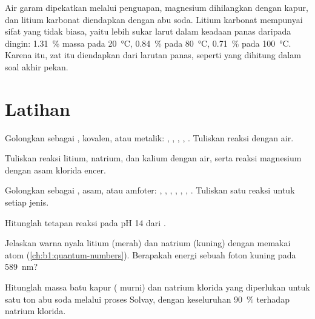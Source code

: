 Air garam dipekatkan melalui penguapan, magnesium dihilangkan dengan
kapur, dan litium karbonat diendapkan dengan abu soda. Litium karbonat
mempunyai sifat yang tidak biasa, yaitu lebih sukar larut dalam keadaan
panas daripada dingin: \qty{1.31}{\percent} massa pada
\qty{20}{\celsius}, \qty{0.84}{\percent} pada \qty{80}{\celsius},
\qty{0.71}{\percent} pada \qty{100}{\celsius}. Karena itu, zat itu
diendapkan dari larutan panas, seperti yang dihitung dalam soal akhir
pekan.

\section{Latihan}

\begin{exercise}[$\star$]\label{exo:b1:s-block:1}
Golongkan sebagai , kovalen, atau metalik: , ,
, , . Tuliskan reaksi  dengan air.
\end{exercise}

\begin{exercise}[$\star$]\label{exo:b1:s-block:2}
Tuliskan reaksi litium, natrium, dan kalium dengan air, serta reaksi
magnesium dengan asam klorida encer.
\end{exercise}

\begin{exercise}[$\star$]\label{exo:b1:s-block:3}
Golongkan sebagai , asam, atau amfoter: , , ,
, , , . Tuliskan satu reaksi untuk setiap jenis.
\end{exercise}

\begin{exercise}[$\star$]\label{exo:b1:s-block:4}
Hitunglah tetapan reaksi  pada pH 14
dari .
\end{exercise}

\begin{exercise}[$\star\star$]\label{exo:b1:s-block:5}
Jelaskan warna nyala litium (merah) dan natrium (kuning) dengan memakai
 atom (\cref{ch:b1:quantum-numbers}). Berapakah energi
sebuah foton kuning pada \qty{589}{nm}?
\end{exercise}

\begin{exercise}[$\star\star$]\label{exo:b1:s-block:6}
Hitunglah massa batu kapur ( murni) dan natrium klorida yang
diperlukan untuk satu ton abu soda melalui proses Solvay, dengan 
keseluruhan \qty{90}{\percent} terhadap natrium klorida.
\end{exercise}

